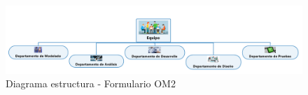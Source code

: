 \begin{figure}[H]
	\centering
	\includegraphics[scale=0.50]{imagenes/diagramaEstructura_2.png}
	\caption{\label{fig:diagramaEstructura}Diagrama estructura - Formulario OM2}
\end{figure}




 






